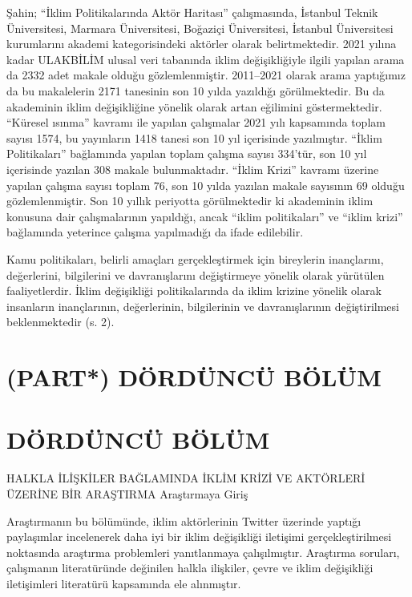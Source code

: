 \documentclass[
]{book}
\begin{document}
Şahin; ``İklim Politikalarında Aktör Haritası'' çalışmasında, İstanbul Teknik Üniversitesi, Marmara Üniversitesi, Boğaziçi Üniversitesi, İstanbul Üniversitesi kurumlarını akademi kategorisindeki aktörler olarak belirtmektedir. 2021 yılına kadar ULAKBİLİM ulusal veri tabanında iklim değişikliğiyle ilgili yapılan arama da 2332 adet makale olduğu gözlemlenmiştir. 2011--2021 olarak arama yaptığımız da bu makalelerin 2171 tanesinin son 10 yılda yazıldığı görülmektedir. Bu da akademinin iklim değişikliğine yönelik olarak artan eğilimini göstermektedir. ``Küresel ısınma'' kavramı ile yapılan çalışmalar 2021 yılı kapsamında toplam sayısı 1574, bu yayınların 1418 tanesi son 10 yıl içerisinde yazılmıştır. ``İklim Politikaları'' bağlamında yapılan toplam çalışma sayısı 334'tür, son 10 yıl içerisinde yazılan 308 makale bulunmaktadır. ``İklim Krizi'' kavramı üzerine yapılan çalışma sayısı toplam 76, son 10 yılda yazılan makale sayısının 69 olduğu gözlemlenmiştir. Son 10 yıllık periyotta görülmektedir ki akademinin iklim konusuna dair çalışmalarının yapıldığı, ancak ``iklim politikaları'' ve ``iklim krizi'' bağlamında yeterince çalışma yapılmadığı da ifade edilebilir.

Kamu politikaları, belirli amaçları gerçekleştirmek için bireylerin inançlarını, değerlerini, bilgilerini ve davranışlarını değiştirmeye yönelik olarak yürütülen faaliyetlerdir. İklim değişikliği politikalarında da iklim krizine yönelik olarak insanların inançlarının, değerlerinin, bilgilerinin ve davranışlarının değiştirilmesi beklenmektedir (s. 2). \citep{demirci2016islevsel}

\hypertarget{part-duxf6rduxfcncuxfc-buxf6luxfcm}{%
\chapter{(PART*) DÖRDÜNCÜ BÖLÜM}\label{part-duxf6rduxfcncuxfc-buxf6luxfcm}}

\hypertarget{duxf6rduxfcncuxfc-buxf6luxfcm}{%
\chapter{DÖRDÜNCÜ BÖLÜM}\label{duxf6rduxfcncuxfc-buxf6luxfcm}}

HALKLA İLİŞKİLER BAĞLAMINDA İKLİM KRİZİ VE AKTÖRLERİ ÜZERİNE BİR ARAŞTIRMA
Araştırmaya Giriş

Araştırmanın bu bölümünde, iklim aktörlerinin Twitter üzerinde yaptığı paylaşımlar incelenerek daha iyi bir iklim değişikliği iletişimi gerçekleştirilmesi noktasında araştırma problemleri yanıtlanmaya çalışılmıştır. Araştırma soruları, çalışmanın literatüründe değinilen halkla ilişkiler, çevre ve iklim değişikliği iletişimleri literatürü kapsamında ele alınmıştır.
\end{document}
